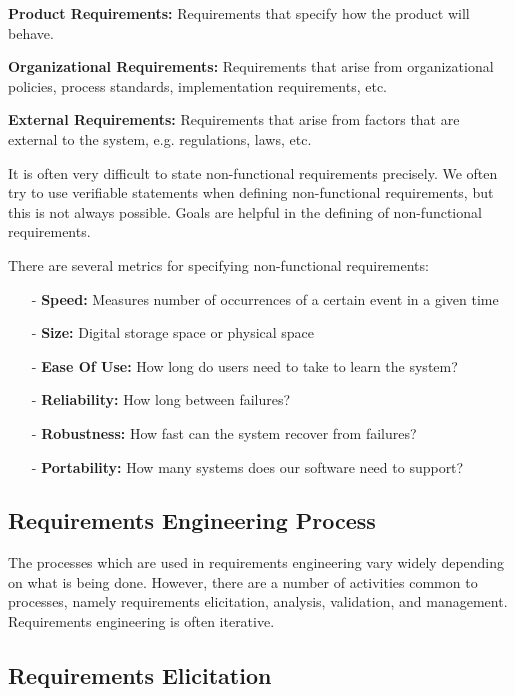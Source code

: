 \documentclass[12pt]{article}
\begin{document}
\textbf{Product Requirements:} Requirements that specify how the product will behave.

\textbf{Organizational Requirements:} Requirements that arise from organizational policies, process standards, implementation requirements, etc.

\textbf{External Requirements:} Requirements that arise from factors that are external to the system, e.g. regulations, laws, etc.

It is often very difficult to state non-functional requirements precisely. We often try to use verifiable statements when defining non-functional requirements, but this is not always possible. Goals are helpful in the defining of non-functional requirements.

\pagebreak
There are several metrics for specifying non-functional requirements:
\begin{itemize}
    \item [-] \textbf{Speed:} Measures number of occurrences of a certain event in a given time

    \item [-] \textbf{Size:} Digital storage space or physical space

    \item [-] \textbf{Ease Of Use:} How long do users need to take to learn the system?

    \item [-] \textbf{Reliability:} How long between failures?

    \item [-] \textbf{Robustness:} How fast can the system recover from failures?

    \item [-] \textbf{Portability:} How many systems does our software need to support?

\end{itemize}

\subsection*{Requirements Engineering Process}

The processes which are used in requirements engineering vary widely depending on what is being done. However, there are a number of activities common to processes, namely requirements elicitation, analysis, validation, and management. Requirements engineering is often iterative.

\subsection*{Requirements Elicitation}
\end{document}
